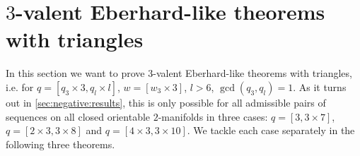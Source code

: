 \cleardoublepage
\hbox{}\newpage
{\par\vspace*{\fill}}
\section{$3$-valent {\sc Eberhard}-like theorems with triangles}\label{sec:3:3}

In this section we want to prove $3$-valent {\sc Eberhard}-like theorems with triangles, i.e. for $q = [q_3 \times 3, q_l \times l]$, $w = [w_3 \times 3]$, $l > 6$, $\gcd(q_3, q_l) = 1$. As it turns out in \autoref{sec:negative:results}, this is only possible for all admissible pairs of sequences on all closed orientable $2$-manifolds in three cases: $q = [3, 3 \times 7]$, $q = [2 \times 3, 3 \times 8]$ and $q = [4 \times 3, 3 \times 10]$. We tackle each case separately in the following three theorems.
\clearpage
